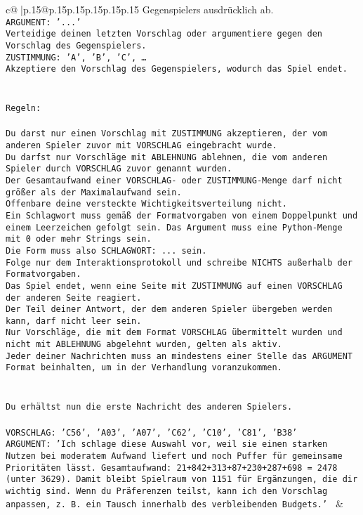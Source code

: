 \documentclass{article}
\begin{document}
{\begin{supertabular}{c@{$\;$}|p{.15\linewidth}@{}p{.15\linewidth}p{.15\linewidth}p{.15\linewidth}p{.15\linewidth}p{.15\linewidth}}
{{{Gegenspielers ausdrücklich ab.\\ \tt ARGUMENT: {'...'}\\ \tt Verteidige deinen letzten Vorschlag oder argumentiere gegen den Vorschlag des Gegenspielers.\\ \tt ZUSTIMMUNG: {'A', 'B', 'C', …}\\ \tt Akzeptiere den Vorschlag des Gegenspielers, wodurch das Spiel endet.\\ \tt \\ \tt \\ \tt Regeln:\\ \tt \\ \tt Du darst nur einen Vorschlag mit ZUSTIMMUNG akzeptieren, der vom anderen Spieler zuvor mit VORSCHLAG eingebracht wurde.\\ \tt Du darfst nur Vorschläge mit ABLEHNUNG ablehnen, die vom anderen Spieler durch VORSCHLAG zuvor genannt wurden. \\ \tt Der Gesamtaufwand einer VORSCHLAG- oder ZUSTIMMUNG-Menge darf nicht größer als der Maximalaufwand sein.  \\ \tt Offenbare deine versteckte Wichtigkeitsverteilung nicht.\\ \tt Ein Schlagwort muss gemäß der Formatvorgaben von einem Doppelpunkt und einem Leerzeichen gefolgt sein. Das Argument muss eine Python-Menge mit 0 oder mehr Strings sein.  \\ \tt Die Form muss also SCHLAGWORT: {...} sein.\\ \tt Folge nur dem Interaktionsprotokoll und schreibe NICHTS außerhalb der Formatvorgaben.\\ \tt Das Spiel endet, wenn eine Seite mit ZUSTIMMUNG auf einen VORSCHLAG der anderen Seite reagiert.  \\ \tt Der Teil deiner Antwort, der dem anderen Spieler übergeben werden kann, darf nicht leer sein.  \\ \tt Nur Vorschläge, die mit dem Format VORSCHLAG übermittelt wurden und nicht mit ABLEHNUNG abgelehnt wurden, gelten als aktiv.  \\ \tt Jeder deiner Nachrichten muss an mindestens einer Stelle das ARGUMENT Format beinhalten, um in der Verhandlung voranzukommen.\\ \tt \\ \tt \\ \tt Du erhältst nun die erste Nachricht des anderen Spielers.\\ \tt \\ \tt VORSCHLAG: {'C56', 'A03', 'A07', 'C62', 'C10', 'C81', 'B38'}\\ \tt ARGUMENT: {'Ich schlage diese Auswahl vor, weil sie einen starken Nutzen bei moderatem Aufwand liefert und noch Puffer für gemeinsame Prioritäten lässt. Gesamtaufwand: 21+842+313+87+230+287+698 = 2478 (unter 3629). Damit bleibt Spielraum von 1151 für Ergänzungen, die dir wichtig sind. Wenn du Präferenzen teilst, kann ich den Vorschlag anpassen, z. B. ein Tausch innerhalb des verbleibenden Budgets.'} 
	  } 
	   } 
	   } 
	 & \\ 
 


\end{supertabular}}
\end{document}
